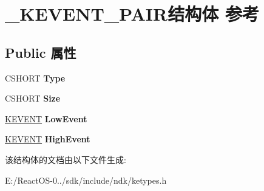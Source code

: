 \hypertarget{struct___k_e_v_e_n_t___p_a_i_r}{}\section{\+\_\+\+K\+E\+V\+E\+N\+T\+\_\+\+P\+A\+I\+R结构体 参考}
\label{struct___k_e_v_e_n_t___p_a_i_r}
\subsection*{Public 属性}
\begin{DoxyCompactItemize}
\item 
\mbox{\label{struct___k_e_v_e_n_t___p_a_i_r_a22f0fae9d231a13a30e2814de1f85c59}} 
C\+S\+H\+O\+RT {\bfseries Type}
\item 
\mbox{\label{struct___k_e_v_e_n_t___p_a_i_r_aaefe6a81bab8ba3aa19016c6521ab42a}} 
C\+S\+H\+O\+RT {\bfseries Size}
\item 
\mbox{\label{struct___k_e_v_e_n_t___p_a_i_r_adaaa9a365ffbf2be5e6da49e956c75ab}} 
\hyperlink{struct___k_e_v_e_n_t}{K\+E\+V\+E\+NT} {\bfseries Low\+Event}
\item 
\mbox{\label{struct___k_e_v_e_n_t___p_a_i_r_a6299fe256b6b37641db0276f75189093}} 
\hyperlink{struct___k_e_v_e_n_t}{K\+E\+V\+E\+NT} {\bfseries High\+Event}
\end{DoxyCompactItemize}


该结构体的文档由以下文件生成\+:\begin{DoxyCompactItemize}
\item 
E\+:/\+React\+O\+S-\/0../sdk/include/ndk/ketypes.\+h\end{DoxyCompactItemize}
